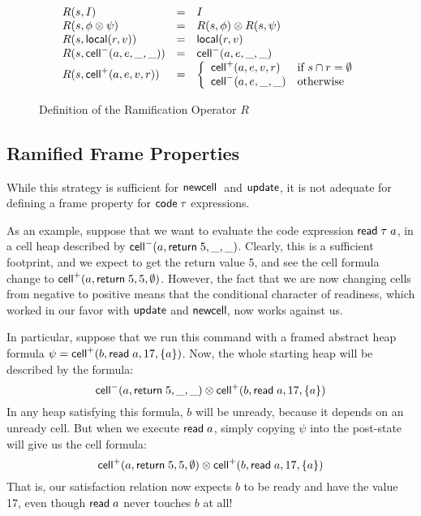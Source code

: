 \documentclass[natbib]{sigplanconf}
\begin{document}
\begin{figure}
{\small
  \begin{displaymath}
    \begin{array}{lcl}
      R(s, I)                 & = & I \\
      R(s, \phi \otimes \psi) & = & R(s, \phi) \otimes R(s, \psi) \\
      R(s, \mbox{\textsf{{local}}}({r}, {v}))   & = & \mbox{\textsf{{local}}}({r}, {v}) \\
      R(s, \mbox{\textsf{{cell}}}^{-}({a}, {e}, {\_}, {\_}))    & = & \mbox{\textsf{{cell}}}^{-}({a}, {e}, {\_}, {\_}) \\
      R(s, \mbox{\textsf{{cell}}}^{+}({a}, {e}, {v}, {r})) & = & \left\{\begin{array}{ll}
                                                \mbox{\textsf{{cell}}}^{+}({a}, {e}, {v}, {r}) 
                                              & \mbox{if } s \cap r = \emptyset \\
                                                \mbox{\textsf{{cell}}}^{-}({a}, {e}, {\_}, {\_})
                                              & \mbox{otherwise}
                                              \end{array}
                                       \right.
    \end{array}
  \end{displaymath}
}
\caption{Definition of the Ramification Operator $R$}
\label{ramify-def}
\end{figure}

\subsection{Ramified Frame Properties}

While this strategy is sufficient for $\mbox{\textsf{{newcell}}}\;$ and
$\mbox{\textsf{{update}}}$, it is not adequate for defining a frame property
for $\mbox{\textsf{{code}}}\;{\tau}$ expressions. 

As an example, suppose that we want to evaluate the code expression $\mbox{\textsf{{read}}}\; \tau\;
a$, in a cell heap described by $\mbox{\textsf{{cell}}}^{-}({a}, {\mbox{\textsf{{return}}}\; 5}, {\_}, {\_})$.  Clearly,
this is a sufficient footprint, and we expect to get the return
value 5, and see the cell formula change to $\mbox{\textsf{{cell}}}^{+}({a}, {\mbox{\textsf{{return}}}\;
  5}, {5}, {\emptyset})$.  However, the fact that we are now changing cells
from negative to positive means that the conditional character of
readiness, which worked in our favor with $\mbox{\textsf{{update}}}$ and
$\mbox{\textsf{{newcell}}}\;\!\!$, now works against us.

In particular, suppose that we run this command with a framed abstract heap
formula $\psi = \mbox{\textsf{{cell}}}^{+}({b}, {\mbox{\textsf{{read}}}\; a}, {17}, {\{{a}\}})$. Now, the
whole starting heap will be described by the formula:
\begin{displaymath}
\mbox{\textsf{{cell}}}^{-}({a}, {\mbox{\textsf{{return}}}\; 5}, {\_}, {\_}) \otimes \mbox{\textsf{{cell}}}^{+}({b}, {\mbox{\textsf{{read}}}\; a}, {17}, {\{{a}\}})  
\end{displaymath}
In any heap satisfying this formula, $b$ will be unready, because it depends 
on an unready cell. But when we execute $\mbox{\textsf{{read}}}\; a$, simply copying $\psi$ 
into the post-state will give us the cell formula:
\begin{displaymath}
\mbox{\textsf{{cell}}}^{+}({a}, {\mbox{\textsf{{return}}}\; 5}, {5}, {\emptyset}) \otimes \mbox{\textsf{{cell}}}^{+}({b}, {\mbox{\textsf{{read}}}\; a}, {17}, {\{{a}\}})
\end{displaymath}
That is, our satisfaction relation now expects $b$ to be ready and have the 
value 17, even though $\mbox{\textsf{{read}}}\; a$ never touches $b$ at all!
\end{document}
